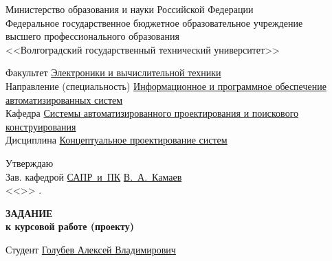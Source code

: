 \begin{titlepage}
    \begin{center}
        Министерство образования и науки Российской Федерации \\
        Федеральное государственное бюджетное образовательное учреждение\\
        высшего профессионального образования\\
        <<Волгоградский государственный технический университет>>\\
    \end{center}
    Факультет \underline{\hspace{1cm}Электроники и вычислительной техники\hspace{4.75cm}}\\
    Направление (специальность) \underline{Информационное и программное обеспечение\hspace{0.2cm}}\\
    \underline{автоматизированных систем\hspace{10.8cm}}\\
    Кафедра \underline{\hspace{1.4cm}Системы автоматизированного проектирования и поискового\hspace{0.3cm}}\\
    \underline{конструирования\hspace{13.3cm}}\\
    Дисциплина \underline{\hspace{1cm}Концептуальное проектирование систем}
    \begin{flushright}
        Утверждаю\\
        Зав. кафедрой \underline{САПР~и~ПК} \hspace{0.2cm} \underline{В.~А.~Камаев} \\
        <<\underline{\hspace{2cm}}>>\underline{\hspace{5cm}} \the{}.
    \end{flushright}
    \begin{center}
        \large \MakeUppercase{\textbf{задание}} \\
        \normalsize\vspace{-0.2cm}\textbf{к курсовой работе (проекту)}
    \end{center}
    \begin{flushleft}
        Студент \underline{\hspace{1cm}Голубев Алексей Владимирович\hspace{2cm}}\\

\end{flushleft}
\end{titlepage}
